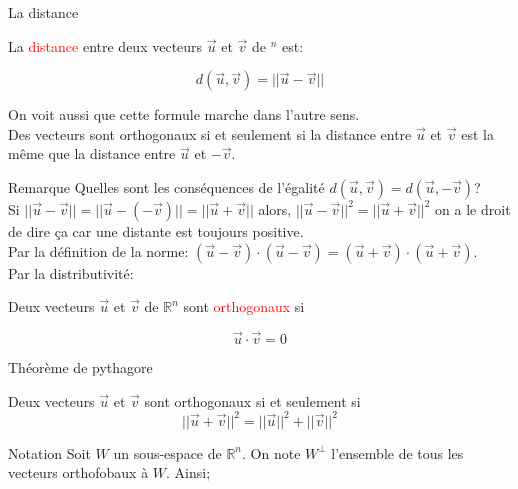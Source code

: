 \begin{parag}{La distance}
    \begin{definition}
        La \textcolor{red}{distance} entre deux vecteurs $\vec{u}$ et $\vec{v}$ de \R$^n$ est:
        \begin{formule}
            \[d(\vec{u}, \vec{v}) = ||\vec{u} - \vec{v}||\]
        \end{formule}
    \end{definition}
    \begin{framedremark}
        On voit aussi que cette formule marche dans l'autre sens.\\
        Des vecteurs sont orthogonaux si et seulement si la distance entre $\vec{u}$ et $\vec{v}$ est la même que la distance entre $\vec{u}$ et $-\vec{v}$.
    \end{framedremark}
    \begin{subparag}{Remarque}
        Quelles sont les conséquences de l'égalité $d(\vec
        {u}, \vec{v}) = d(\vec{u}, -\vec{v})$?\\
        Si $||\vec{u} - \vec{v}|| = ||\vec{u} - (-\vec{v})|| = || \vec{u}+\vec{v}||$ alors, $||\vec{u}-\vec{v}||^2 = ||\vec{u} + \vec{v}||^2$ on a le droit de dire ça car une distante est toujours positive.
        \\
        Par la définition de la norme:
        $(\vec{u} - \vec{v})\cdot(\vec{u}-\vec{v}) = (\vec{u}+\vec{v})\cdot(\vec{u}+\vec{v})$.
        \\
        Par la distributivité:
        \[\]
    \end{subparag}
    \begin{definition}
        Deux vecteurs $\vec{u}$ et $\vec{v}$ de $\mathbb{R}^n$ sont \textcolor{red}{orthogonaux} si 
        \begin{formule}
            \[\vec{u}\cdot \vec{v} = 0\]
        \end{formule}
    \end{definition}
        \begin{subparag}{Théorème de pythagore}
            \begin{theoreme}
                Deux vecteurs $\vec{u}$ et $\vec{v}$ sont orthogonaux si et seulement si 
                \[||\vec{u}+\vec{v}||^2 = ||\vec{u}||^2 + ||\vec{v}||^2\]
            \end{theoreme}
        \end{subparag}
        \begin{subparag}{Notation}
            Soit $W$ un sous-espace de $\mathbb{R}^n$. On note $W^\perp$ l'ensemble de tous les vecteurs orthofobaux à $W$. Ainsi;

\end{subparag}
\end{parag}
